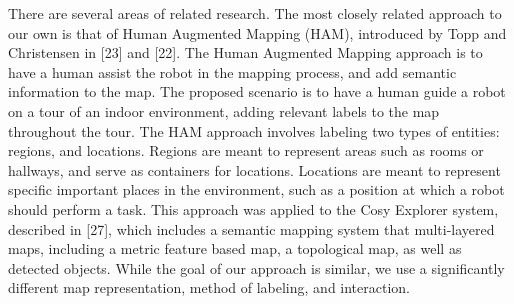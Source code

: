 There are several areas of related research. The most
closely related approach to our own is that of Human
Augmented Mapping (HAM), introduced by Topp and Christensen
in [23] and [22]. The Human Augmented Mapping
approach is to have a human assist the robot in the mapping
process, and add semantic information to the map. The
proposed scenario is to have a human guide a robot on a tour
of an indoor environment, adding relevant labels to the map
throughout the tour. The HAM approach involves labeling
two types of entities: regions, and locations. Regions are
meant to represent areas such as rooms or hallways, and
serve as containers for locations. Locations are meant to
represent specific important places in the environment, such
as a position at which a robot should perform a task. This
approach was applied to the Cosy Explorer system, described
in [27], which includes a semantic mapping system that
multi-layered maps, including a metric feature based map, a
topological map, as well as detected objects. While the goal
of our approach is similar, we use a significantly different
map representation, method of labeling, and interaction.